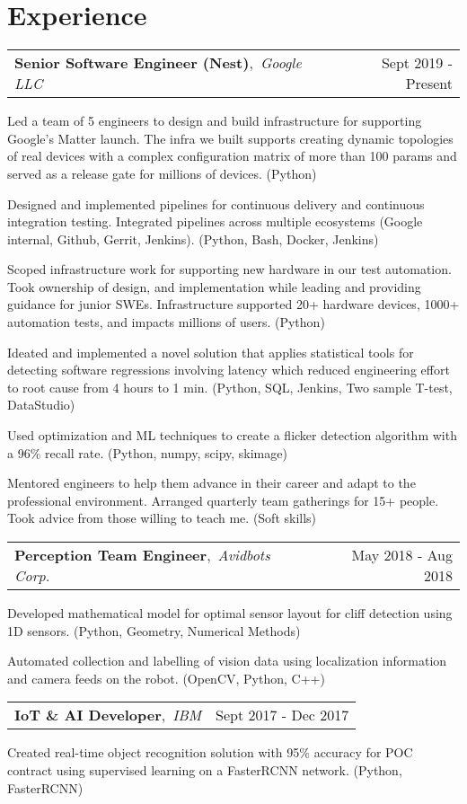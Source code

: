 \documentclass[a4paper]{article}
\makeatletter
\newcommand{\headeralgined}[2]{%
\normalfont%
\begin{tabular*}{\textwidth}{l@{\extracolsep{\fill}}r}%
  #1 & #2 \\%
\end{tabular*}%
\vspace{-6pt}%
}
\newcommand{\experience}[3]{%
  \headeralgined{%
    \textbf{#1},~\textit{#2}%
  }{#3}%
  \vspace{1pt}
}
\newcommand{\resumeitemstartlist}{\begin{itemize}[leftmargin=*]}
\newcommand{\resumeitemendlist}{\end{itemize}\vspace{2pt}}
\newcommand{\resumeitem}[1]{%
  \item{\normalsize{#1\vspace{-4pt}}}%
}
\newcommand{\tech}[1]{%
\textcolor{tealblue}{#1}%
}
\makeatother
\begin{document}

\section{Experience}


\experience{Senior Software Engineer (Nest)}{Google LLC}{Sept 2019 - Present}
\resumeitemstartlist
{%
  \resumeitem{%
    Led a team of 5 engineers to design and build infrastructure for supporting Google's Matter launch.
    The infra we built supports creating dynamic topologies of real devices with a complex configuration
    matrix of more than 100 params and served as a release gate for millions of devices.
    \tech{(Python)}
  }
  \resumeitem{%
    Designed and implemented pipelines for continuous delivery and continuous integration testing.
    Integrated pipelines across multiple ecosystems (Google internal, Github, Gerrit, Jenkins).
    \tech{(Python, Bash, Docker, Jenkins)}
  }
  \resumeitem{%
    Scoped infrastructure work for supporting new hardware in our test automation.
    Took ownership of design, and implementation while leading and providing guidance for junior SWEs.
    Infrastructure supported 20+ hardware devices, 1000+ automation tests, and impacts millions of users.
    \tech{(Python)}
  }
  \resumeitem{%
    Ideated and implemented a novel solution that applies statistical tools for detecting software
    regressions involving latency which reduced engineering effort to root cause from 4 hours to 1 min.
    \tech{(Python, SQL, Jenkins, Two sample T-test, DataStudio)}
  }
  \resumeitem{%
    Used optimization and ML techniques to create a flicker detection algorithm with a 96\% recall rate.
    \tech{(Python, numpy, scipy, skimage)}
  }
  \resumeitem{%
    Mentored engineers to help them advance in their career and adapt to the professional environment.
    Arranged quarterly team gatherings for 15+ people.
    Took advice from those willing to teach me.
    \tech{(Soft skills)}
  }
}
\resumeitemendlist


\experience{Perception Team Engineer}{Avidbots Corp.}{May 2018 - Aug 2018}
\resumeitemstartlist
{%
  \resumeitem{%
    Developed mathematical model for optimal sensor layout for cliff detection using 1D sensors.
    \tech{(Python, Geometry, Numerical Methods)}
  }
  \resumeitem{%
    Automated collection and labelling of vision data using localization information and camera feeds on the robot.
    \tech{(OpenCV, Python, C++)}
  }
}
\resumeitemendlist


\experience{IoT \& AI Developer}{IBM}{Sept 2017 - Dec 2017}
\resumeitemstartlist
{%
  \resumeitem{%
    Created real-time object recognition solution with 95\% accuracy for POC contract using
    supervised learning on a FasterRCNN network.
    \tech{(Python, FasterRCNN)}
  }
}
\resumeitemendlist
\end{document}
